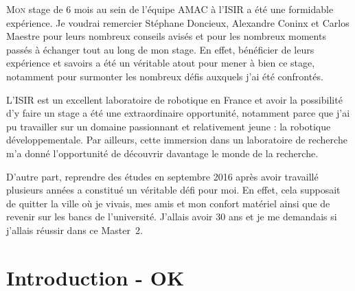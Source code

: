 \documentclass[draft]{llncs}
\begin{document}
\lettrine{M}{on} stage de 6 mois au sein de l'équipe AMAC à l'ISIR a été une formidable expérience.
Je voudrai remercier Stéphane Doncieux, Alexandre Coninx et Carlos Maestre pour leurs nombreux conseils avisés et pour les nombreux moments passés à échanger tout au long de mon stage.
En effet, bénéficier de leurs expérience et savoirs a été un véritable atout pour mener à bien ce stage, notamment pour surmonter les nombreux défis auxquels j'ai été confrontés.

L'ISIR est un excellent laboratoire de robotique en France et avoir la possibilité d'y faire un stage a été une extraordinaire opportunité, notamment parce que j'ai pu travailler sur un domaine passionnant et relativement jeune : la robotique développementale.
Par ailleurs, cette immersion dans un laboratoire de recherche m'a donné l'opportunité de découvrir davantage le monde de la recherche.

D'autre part, reprendre des études en septembre 2016 après avoir travaillé plusieurs années a constitué un véritable défi pour moi.
En effet, cela supposait de quitter la ville où je vivais, mes amis et mon confort matériel ainsi que de revenir sur les bancs de l'université.
J'allais avoir 30 ans et je me demandais si j'allais réussir dans ce Master~2.


\newpage

\section{Introduction - OK}





\end{document}
